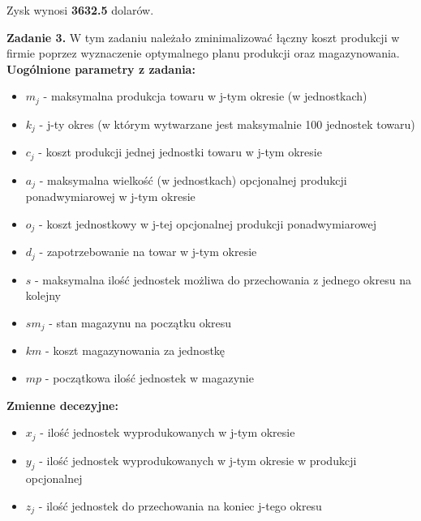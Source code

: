 \documentclass[15pt, a4paper]{article}
\begin{document}
\vspace {0.5cm}

Zysk wynosi \textbf{3632.5} dolarów.

\vspace{0.5cm}

\noindent\hrulefill

\vspace{0.5cm}


\noindent\textbf{Zadanie 3.} W tym zadaniu należało zminimalizować łączny koszt produkcji w firmie poprzez wyznaczenie optymalnego planu produkcji oraz magazynowania.\\

\noindent\textbf{Uogólnione parametry z zadania:}

\begin{itemize}
    \item \( m_j \) - maksymalna produkcja towaru w j-tym okresie (w jednostkach)
    \item \( k_j \) - j-ty okres (w którym wytwarzane jest maksymalnie 100 jednostek towaru)
    \item \( c_j \) - koszt produkcji jednej jednostki towaru w j-tym okresie
    \item \( a_j \) - maksymalna wielkość (w jednostkach) opcjonalnej produkcji ponadwymiarowej w j-tym okresie
    \item \( o_j \) - koszt jednostkowy w j-tej opcjonalnej produkcji ponadwymiarowej
    \item \( d_j \) - zapotrzebowanie na towar w j-tym okresie
    \item \( s \) - maksymalna ilość jednostek możliwa do przechowania z jednego okresu na kolejny
    \item \( sm_j \) - stan magazynu na początku okresu
    \item \( km \) - koszt magazynowania za jednostkę 
    \item \( mp \) - początkowa ilość jednostek w magazynie
\end{itemize}

\noindent\textbf{Zmienne decezyjne:}

\begin{itemize}
    \item \( x_j \) - ilość jednostek wyprodukowanych w j-tym okresie
    \item \( y_j \) - ilość jednostek wyprodukowanych w j-tym okresie w produkcji opcjonalnej
    \item \( z_j \) - ilość jednostek do przechowania na koniec j-tego okresu
\end{itemize}
\end{document}
